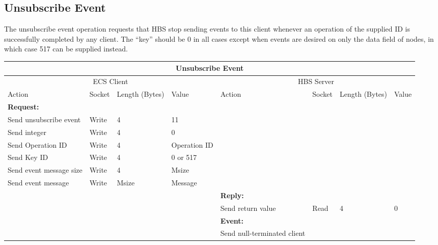 \newpage
\subsection{Unsubscribe Event}

The unsubscribe event operation requests that HBS stop sending events
to this client whenever an operation of the supplied ID is successfully
completed by any client.  The ``key'' should be 0 in all cases except when 
events are desired on only the data field of nodes, in which case 517 can
be supplied instead. 

\bigskip
\small
\begin{tabular}{|p{1.2in}|p{.4in}|p{.4in}|p{.5in}|p{1.2in}|p{.4in}|p{.4in}|p{.5in} |} \hline
\multicolumn{8}{|c|}{{\bf Unsubscribe Event}} \\ \hline
\multicolumn{4}{|c|}{ECS Client} & \multicolumn{4}{|c|}{HBS Server} \\ \hline
Action            & Socket & Length  
                            (Bytes)& Value & Action       & Socket & Length 
                                                                    (Bytes)& Value \\ \hline
\multicolumn{4}{|l}{{\bf Request:}}&\multicolumn{4}{|l|}{~} \\ \hline
Send unsubscribe event   & Write  & 4     & 11     &              &        &       &       \\ \hline
Send  integer      & Write  & 4     &  0 &           &        &       &       \\ \hline
Send Operation ID    & Write  & 4     & Operation ID   &              &        &       &       \\ \hline
Send Key ID    & Write  & 4     &  0 or 517 &        &        &       &       \\ \hline
Send event
message size      & Write  & 4     &  Msize &         &        &       &       \\ \hline
Send event message
                  & Write  &  Msize  &  Message &     &        &       &       \\ \hline
\multicolumn{4}{|l}{~}&\multicolumn{4}{|l|}{{\bf Reply:}} \\ \hline
                  &        &       &       & Send return
                                             value        & Read   &  4    & 0       \\ \hline
\multicolumn{4}{|l}{~}&\multicolumn{4}{|l|}{{\bf Event:}} \\ \hline
                  &        &       &       & Send null-terminated client

\end{tabular}
